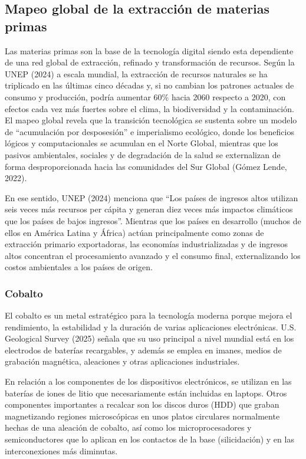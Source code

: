 \documentclass[stu,12pt,a4paper]{apa7}
\begin{document}
    \subsection{Mapeo global de la extracción de materias primas}
Las materias primas son la base de  la tecnología digital siendo esta dependiente de una red global de extracción, refinado y transformación de recursos. Según la UNEP (2024) a escala mundial, la extracción de recursos naturales se ha triplicado en las últimas cinco décadas y, si no cambian los patrones actuales de consumo y producción, podría aumentar 60\% hacia 2060 respecto a 2020, con efectos cada vez más fuertes sobre el clima, la biodiversidad y la contaminación. 
El mapeo global revela que la transición tecnológica se sustenta sobre un modelo de ``acumulación por desposesión'' e imperialismo ecológico, donde los beneficios lógicos y computacionales se acumulan en el Norte Global, mientras que los pasivos ambientales, sociales y de degradación de la salud se externalizan de forma desproporcionada hacia las comunidades del Sur Global (Gómez Lende, 2022).

En ese sentido, UNEP (2024) menciona que ``Los países de ingresos altos utilizan seis veces más recursos per cápita y generan diez veces más impactos climáticos que los países de bajos ingresos''. Mientras que los países en desarrollo (muchos de ellos en América Latina y África) actúan principalmente como zonas de extracción primario exportadoras, las economías industrializadas y de ingresos altos concentran el procesamiento avanzado y el consumo final, externalizando los costos ambientales a los países de origen.
    \subsubsection{Cobalto}
El cobalto es un metal estratégico para la tecnología moderna porque mejora el rendimiento, la estabilidad y la duración de varias aplicaciones electrónicas. U.S. Geological Survey (2025) señala que su uso principal a nivel mundial está en los electrodos de baterías recargables, y además se emplea en imanes, medios de grabación magnética, aleaciones y otras aplicaciones industriales.

En relación a los componentes de los dispositivos electrónicos, se utilizan  en las baterías de iones de litio que necesariamente están incluidas en laptops. Otros componentes importantes a recalcar son los discos duros (HDD) que graban magnetizando regiones microscópicas en unos platos circulares normalmente  hechas de una aleación de cobalto, así como los microprocesadores y semiconductores que lo aplican en los contactos de la base (silicidación) y en las interconexiones más diminutas. 
\end{document}
